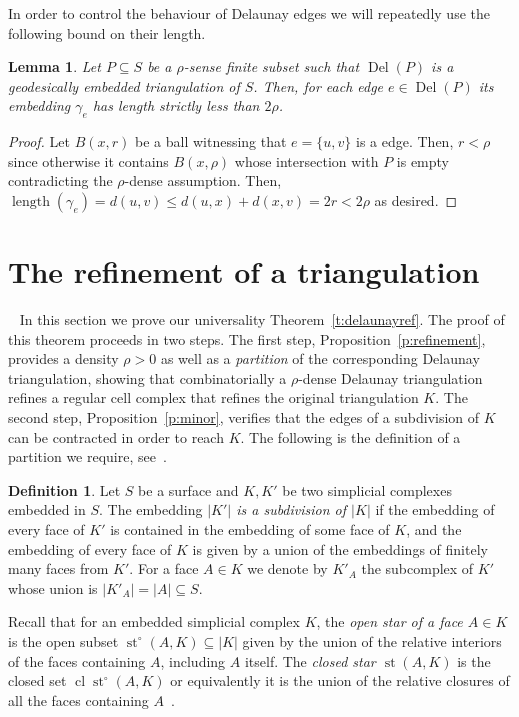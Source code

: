 \documentclass[11pt]{article}
\newtheorem{lemma}[theorem]{Lemma}
\numberwithin{claimcounter}{theorem}
\theoremstyle{remark}
\theoremstyle{definition}
\newtheorem{definition}[theorem]{Definition}
\numberwithin{theorem}{section}
\DeclareMathOperator{\st}{st}
\DeclareMathOperator{\cl}{cl}
\DeclareMathOperator{\Del}{Del}
\DeclareMathOperator{\length}{length}
\begin{document}
%
In order to control the behaviour of Delaunay edges we will repeatedly use the following bound on their length.
%
\begin{lemma}
  Let $P\subseteq S$ be a $\rho$-sense finite subset such that $\Del(P)$ is a geodesically embedded triangulation of $S$.
  Then, for each edge $e\in \Del(P)$ its embedding $\gamma_e$ has length strictly less than $2\rho$.
\end{lemma}
\begin{proof}
  Let $B(x,r)$ be a ball witnessing that $e=\{u,v\}$ is a edge.
  Then, $r< \rho$ since otherwise it contains $B(x,\rho)$ whose intersection with $P$ is empty contradicting the $\rho$-dense assumption.
  Then, $\length(\gamma_e)=d(u,v)\leq d(u,x)+d(x,v) = 2r < 2\rho$ as desired.
\end{proof}
%
%
%
%
\section{The refinement of a triangulation}
~\label{sec:Universality}
In this section we prove our universality Theorem~\ref{t:delaunayref}.
The proof of this theorem proceeds in two steps.
The first step, Proposition~\ref{p:refinement}, provides a density $\rho>0$ as well as a \emph{partition} of the corresponding Delaunay triangulation,  
showing that combinatorially a $\rho$-dense Delaunay triangulation refines a regular cell complex that refines the original triangulation $K$. 
The second step, Proposition~\ref{p:minor}, verifies that the edges of a subdivision of $K$ can be contracted in order to reach $K$.
The following is the definition of a partition we require, see~\cite[Sect. 15]{munkres84-elements}.
%
\begin{definition}
    Let $S$ be a surface and $K,K'$ be two simplicial complexes embedded in $S$. The embedding \emph{$|K'|$ is a subdivision of $|K|$} if the embedding of every face of $K'$ is contained in the embedding of some face of $K$, and the embedding of every face of $K$ is given by a union of the embeddings of finitely many faces from $K'$.
    For a face $A\in K$ we denote by $K'_A$ the subcomplex of $K'$ whose union is $|K'_A| = |A|\subseteq S$.
\end{definition}
%
Recall that for an embedded simplicial complex $K$, the \emph{open star of a face $A\in K$} is the open subset $\st^\circ(A,K)\subseteq |K|$ given by the union of the relative interiors of the faces containing $A$, including $A$ itself. The \emph{closed star $\st(A,K)$} is the closed set $\cl \st^\circ(A,K)$ or equivalently it is the union of the relative closures of all the faces containing $A$~\cite{munkres84-elements}.
\end{document}
